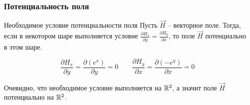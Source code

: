 \begin{frame}\frametitle{Потенциальность поля}
  \begin{block}{Необходимое условие потенциальности поля}
    Пусть \(\vec H\) -- векторное поле.
    Тогда, если в некотором шаре выполняется условие
    \(\frac{\partial H_x}{\partial y} = \frac{\partial H_y}{\partial x}\),
    то поле \(\vec H\) потенциально в этом шаре\cite[ст.~270,272]{zorich}.
  \end{block}

  \[
    \frac{\partial H_x}{\partial y} = \frac{\partial (e^x)}{\partial y} = 0
    \qquad
    \frac{\partial H_y}{\partial x} = \frac{\partial (-e^y)}{\partial x} = 0
  \]

  Очевидно, что необходимое условие выполняется на \(\mathbb{R}^2\), а значит
  поле \(\vec H\) потенциально на \(\mathbb{R}^2\).

\end{frame}
